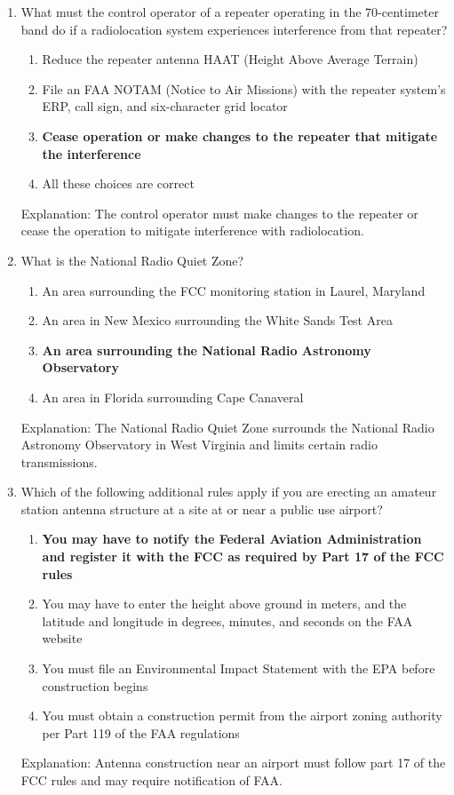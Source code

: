 \begin{enumerate}
       \item What must the control operator of a repeater operating in the 70-centimeter band do if a radiolocation system experiences interference from that repeater?
       \begin{enumerate}
        \item Reduce the repeater antenna HAAT (Height Above Average Terrain)
         \item  File an FAA NOTAM (Notice to Air Missions) with the repeater system's ERP, call sign, and six-character grid locator
       \item \textbf {Cease operation or make changes to the repeater that mitigate the interference}
        \item  All these choices are correct
        \end{enumerate}
          \textcolor{myred}{Explanation:}
      The control operator must make changes to the repeater or cease the operation to mitigate interference with radiolocation.
        
         \item What is the National Radio Quiet Zone?
       \begin{enumerate}
          \item An area surrounding the FCC monitoring station in Laurel, Maryland
      \item  An area in New Mexico surrounding the White Sands Test Area
    \item \textbf {An area surrounding the National Radio Astronomy Observatory}
       \item  An area in Florida surrounding Cape Canaveral
        \end{enumerate}
          \textcolor{myred}{Explanation:}
       The National Radio Quiet Zone surrounds the National Radio Astronomy Observatory in West Virginia and limits certain radio transmissions.
       
        \item Which of the following additional rules apply if you are erecting an amateur station antenna structure at a site at or near a public use airport?
        \begin{enumerate}
        \item \textbf {You may have to notify the Federal Aviation Administration and register it with the FCC as required by Part 17 of the FCC rules}
       \item  You may have to enter the height above ground in meters, and the latitude and longitude in degrees, minutes, and seconds on the FAA website
         \item  You must file an Environmental Impact Statement with the EPA before construction begins
    \item  You must obtain a construction permit from the airport zoning authority per Part 119 of the FAA regulations
      \end{enumerate}
    \textcolor{myred}{Explanation:}
     Antenna construction near an airport must follow part 17 of the FCC rules and may require notification of FAA.
     

\end{enumerate}
